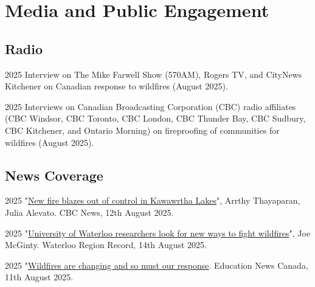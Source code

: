 \documentclass[12pt,letterpaper]{report}
\begin{document}
    \section*{Media and Public Engagement} %

    \subsection*{Radio}
        
        \begin{tablist}
        
        \item[2025] \tab Interview on The Mike Farwell Show (570AM), Rogers TV, and CityNews Kitchener on Canadian response to wildfires (August 2025).
        \item[2025]  \tab Interviews on Canadian Broadcasting Corporation (CBC) radio affiliates (CBC Windsor, CBC Toronto, CBC London, CBC Thunder Bay, CBC Sudbury, CBC Kitchener, and Ontario Morning) on fireproofing of communities for wildfires (August 2025).
        
        \end{tablist}

    \subsection*{News Coverage}

    \begin{tablist}
    
    \item[2025] \tab "\href{https://www.cbc.ca/news/canada/toronto/kawartha-lakes-fourth-fire-active-1.7606768}{New fire blazes out of control in Kawawrtha Lakes}", Arrthy Thayaparan, Julia Alevato. CBC News, 12th August 2025.

    \item[2025] \tab "\href{https://www.therecord.com/news/waterloo-region/university-of-waterloo-researchers-look-for-new-ways-to-fight-wildfires/article_3c6d2d6a-f8e3-54ce-8e4d-4c2df5c76241.html}{University of Waterloo researchers look for new ways to fight wildfires}", Joe McGinty. Waterloo Region Record, 14th August 2025.

    \item[2025] \tab "\href{https://educationnewscanada.com/article/education/level/university/1/1153676/wildfires-are-changing-and-so-must-our-response.html}{Wildfires are changing and so must our response}. Education News Canada, 11th August 2025. 
    
    \end{tablist}
    
\end{document}
